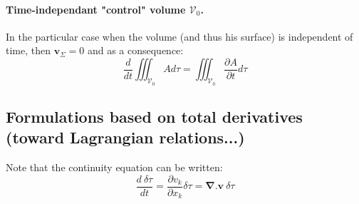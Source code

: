 \paragraph{Time-independant "control" volume $\mathcal{V}_0$.} 
In the particular case when the volume (and thus his surface) is independent of time, then $  \mathbf{v}_{\Sigma}=0$ and as a consequence:
\begin{equation}
 \displaystyle
 	\frac{d}{dt}\iiint_{\mathcal{V}_0} A d\tau = \iiint_{\mathcal{V}_0}\frac{\partial A}{\partial t} d\tau
\end{equation}

\subsection{Formulations based on total derivatives (toward Lagrangian relations...)}
Note that the continuity equation can be written:
\begin{equation}
	\displaystyle
	\frac{d\ \delta \tau}{dt}=\frac{\partial v_{k}}{\partial x_k} \delta\tau= \mathbf{\nabla}.\mathbf{v}\ \delta\tau
\end{equation}

